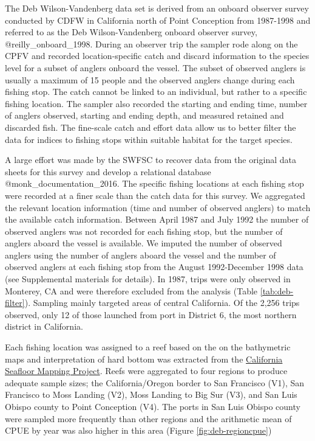 \documentclass[11pt,
  letterpaper,
]{article}
\begin{document}
The Deb Wilson-Vandenberg data set is derived from an onboard observer survey conducted by CDFW in California north of Point Conception from 1987-1998 and referred to as the Deb Wilson-Vandenberg onboard observer survey, @reilly\_onboard\_1998. During an observer trip the sampler rode along on the CPFV and recorded location-specific catch and discard information to the species level for a subset of anglers onboard the vessel. The subset of observed anglers is usually a maximum of 15 people and the observed anglers change during each fishing stop. The catch cannot be linked to an individual, but rather to a specific fishing location. The sampler also recorded the starting and ending time, number of anglers observed, starting and ending depth, and measured retained and discarded fish. The fine-scale catch and effort data allow us to better filter the data for indices to fishing stops within suitable habitat for the target species.

A large effort was made by the SWFSC to recover data from the original data sheets for this survey and develop a relational database @monk\_documentation\_2016. The specific fishing locations at each fishing stop were recorded at a finer scale than the catch data for this survey. We aggregated the relevant location information (time and number of observed anglers) to match the available catch information. Between April 1987 and July 1992 the number of observed anglers was not recorded for each fishing stop, but the number of anglers aboard the vessel is available. We imputed the number of observed anglers using the number of anglers aboard the vessel and the number of observed anglers at each fishing stop from the August 1992-December 1998 data (see Supplemental materials for details). In 1987, trips were only observed in Monterey, CA and were therefore excluded from the analysis (Table \ref{tab:deb-filter}). Sampling mainly targeted areas of central California. Of the 2,256 trips observed, only 12 of those launched from port in District 6, the most northern district in California.

Each fishing location was assigned to a reef based on the on the bathymetric maps and interpretation of hard bottom was extracted from the \href{http://seafloor.otterlabs.org/index.html}{California Seafloor Mapping Project}. Reefs were aggregated to four regions to produce adequate sample sizes; the California/Oregon border to San Francisco (V1), San Francisco to Moss Landing (V2), Moss Landing to Big Sur (V3), and San Luis Obispo county to Point Conception (V4). The ports in San Luis Obispo county were sampled more frequently than other regions and the arithmetic mean of CPUE by year was also higher in this area (Figure \ref{fig:deb-regioncpue})
\end{document}
